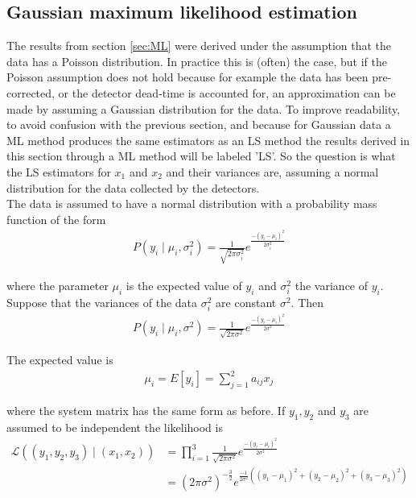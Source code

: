 \documentclass[report,12pt]{report}
\begin{document}
\subsection{Gaussian maximum likelihood estimation}\label{sec:LS}
The results from section \ref{sec:ML} were derived under the assumption that the data has a Poisson distribution. In practice this is (often) the case, but if the Poisson assumption does not hold because for example the data has been pre-corrected, or the detector dead-time is accounted for, an approximation can be made by assuming a Gaussian distribution for the data. To improve readability, to avoid confusion with the previous section, and because for Gaussian data a ML method produces the same estimators as an LS method the results derived in this section through a ML method will be labeled 'LS'. So the question is what the LS estimators for $x_1$ and $x_2$ and their variances are, assuming a normal distribution for the data collected by the detectors.\\

The data is assumed to have a normal distribution with a probability mass function of the form
\begin{align}
	P(y_i \mid \mu_i, \sigma_i^2) = \frac{1}{\sqrt{2 \pi \sigma_i^2}} 
	e^{\frac{-(y_i-\mu_i)^2}{2 \sigma_i^2}}
\end{align}

where the parameter $\mu_i$ is the expected value of $y_i$ and $\sigma_i^2$ the variance of $y_i$. Suppose that the variances of the data $\sigma_i^2$ are constant $\sigma^2$. Then
\begin{align}
	P(y_i \mid \mu_i, \sigma^2) = \frac{1}{\sqrt{2 \pi \sigma ^2}} 
	e^{\frac{-(y_i-\mu_i)^2}{2 \sigma^2}}
\end{align}

The expected value is
\begin{align}
	\mu_i = E[y_i] = \sum_{j=1}^{2}a_{ij}x_j
\end{align}

where the system matrix has the same form as before. If $y_1, y_2$ and $y_3$ are assumed to be independent the likelihood is
\begin{align}
	\mathcal{L} \left( (y_1, y_2, y_3) \mid (x_1, x_2) \right) 
	&= \prod_{i=1}^{3} \frac{1}{\sqrt{2 \pi \sigma^2}} 
	e^{\frac{-(y_i-\mu_i)^2}{2 \sigma^2}}
	\nonumber\\
	&=(2\pi  \sigma^2)^{-\frac{3}{2}}
	e^{\frac{-1}{2 \sigma^2} \left( 
	(y_1 - \mu_1)^2 + (y_2 - \mu_2)^2 + (y_3 - \mu_3)^2 
	\right)}
\end{align}
\end{document}
